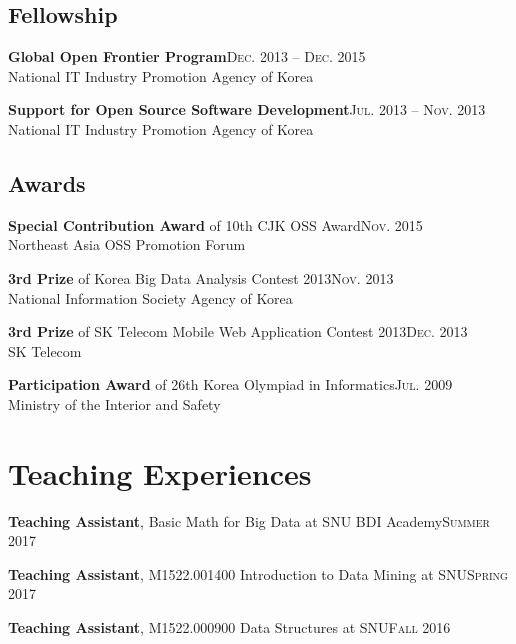 \documentclass[11pt,a4paper]{article}
\renewenvironment{itemize}{
  \begin{list}{}{
    \setlength{\leftmargin}{1.5em}
    \setlength{\itemsep}{0.5em}
    \setlength{\parskip}{0pt}
    \setlength{\parsep}{0.25em}
  }
}{
  \end{list}
}
\begin{document}
\subsection*{Fellowship}
\begin{itemize}
  \item \textbf{Global Open Frontier Program}\hfill\textsc{Dec. 2013 -- Dec. 2015}\\
        National IT Industry Promotion Agency of Korea
  \item \textbf{Support for Open Source Software Development}\hfill\textsc{Jul. 2013 -- Nov. 2013}\\
        National IT Industry Promotion Agency of Korea
\end{itemize}
\subsection*{Awards}
\begin{itemize}
  \item \textbf{Special Contribution Award} of 10th CJK OSS Award\hfill\textsc{Nov. 2015}\\
        Northeast Asia OSS Promotion Forum
  \item \textbf{3rd Prize} of Korea Big Data Analysis Contest 2013\hfill\textsc{Nov. 2013}\\
        National Information Society Agency of Korea
  \item \textbf{3rd Prize} of SK Telecom Mobile Web Application Contest 2013\hfill\textsc{Dec. 2013}\\
        SK Telecom
  \item \textbf{Participation Award} of 26th Korea Olympiad in Informatics\hfill\textsc{Jul. 2009}\\
        Ministry of the Interior and Safety
\end{itemize}

\section*{Teaching Experiences}
\begin{itemize}
  \setlength\itemsep{0.1em}
  \item \textbf{Teaching Assistant}, Basic Math for Big Data at SNU BDI Academy\hfill\textsc{Summer 2017}
  \item \textbf{Teaching Assistant}, M1522.001400 Introduction to Data Mining at SNU\hfill\textsc{Spring 2017}
  \item \textbf{Teaching Assistant}, M1522.000900 Data Structures at SNU\hfill\textsc{Fall 2016}
\end{itemize}
\end{document}
